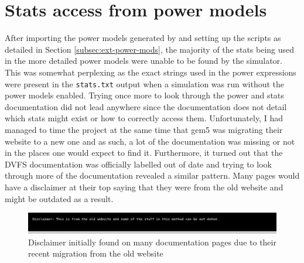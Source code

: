 \section{Stats access from power models}
After importing the power models generated by 
\cite{walker_mattw200gemstone-applypower_2018} and setting up the scripts as
detailed in Section \ref{subsec:ext-power-mods}, the majority of the stats 
being used in the more detailed power models were unable to be found by the 
simulator. This was somewhat perplexing as the exact strings used in the 
power expressions were present in the \texttt{stats.txt} output when a 
simulation was run without the power models enabled. Trying once more to 
look through the power \cite{noauthor_gem5_nodate-1} and stats 
\cite{noauthor_gem5_nodate-3} documentation did not lead anywhere since the 
documentation does not detail which stats might exist or how to correctly 
access them. Unfortunately, I had managed to time the project at the same 
time that gem5 was migrating their website to a new one and as such, a lot 
of the documentation was missing or not in the places one would expect to 
find it. Furthermore, it turned out that the DVFS documentation was 
officially labelled out of date \cite{noauthor_gem5_nodate} and trying to 
look through more of the documentation revealed a similar pattern. Many 
pages would have a disclaimer at their top saying that they were from the 
old website and might be outdated as a result.
\begin{figure}[H]
    \centering
    \includegraphics[width=0.9\linewidth]{screenshots/gem5-docs-disclaimer.png}
    \caption{Disclaimer initially found on many documentation pages due to 
        their recent migration from the old website}
\end{figure}

